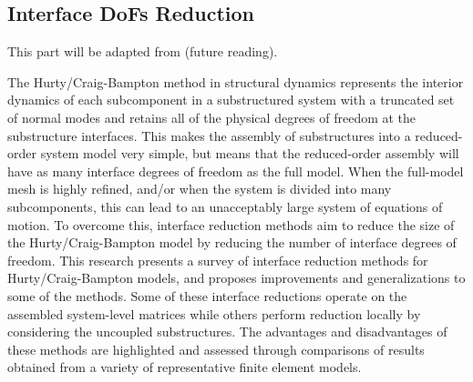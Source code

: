\documentclass[../DomainDecomposition.tex]{subfiles}
\begin{document}
\subsection{Interface DoFs Reduction} 

This part will be adapted from \cite{krattiger2019interface} (future reading). 
\vspace{10pt} 

The Hurty/Craig-Bampton method in structural dynamics represents the interior dynamics of each subcomponent in a substructured system with a truncated set of normal modes and retains all of the physical degrees of freedom at the substructure interfaces. This makes the assembly of substructures into a reduced-order system model very simple, but means that the reduced-order assembly will have as many interface degrees of freedom as the full model. When the full-model mesh is highly refined, and/or when the system is divided into many subcomponents, this can lead to an unacceptably large system of equations of motion. To overcome this, interface reduction methods aim to reduce the size of the Hurty/Craig-Bampton model by reducing the number of interface degrees of freedom. This research presents a survey of interface reduction methods for Hurty/Craig-Bampton models, and proposes improvements and generalizations to some of the methods. Some of these interface reductions operate on the assembled system-level matrices while others perform reduction locally by considering the uncoupled substructures. The advantages and disadvantages of these methods are highlighted and assessed through comparisons of results obtained from a variety of representative finite element models.
\end{document}

